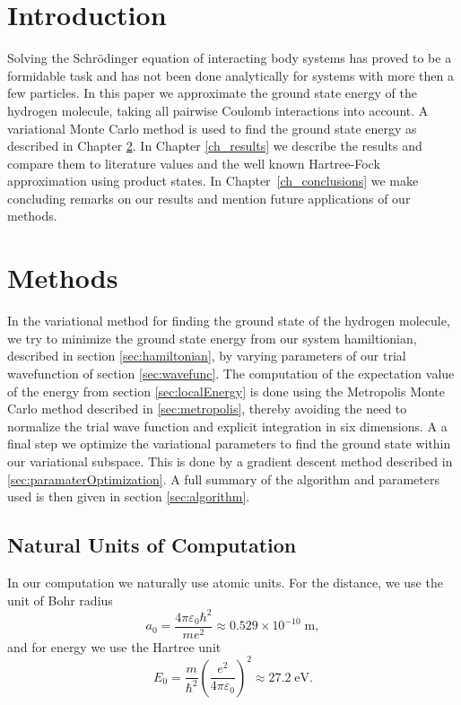\documentclass[twoside]{article}
\newcommand{\unit}[1]{\ensuremath{\; \mathrm{#1}}}
\begin{document}
\section{Introduction}
Solving the Schr\"odinger equation of interacting body systems has proved to be a formidable task and has not been done analytically for systems with more then a few particles. In this paper we approximate the ground state energy of the hydrogen molecule, taking all pairwise Coulomb interactions into account. A variational Monte Carlo method  is used to find the ground state energy as described in Chapter \ref{ch_methods}. In Chapter \ref{ch_results} we describe the results and compare them to literature values and the well known Hartree-Fock approximation using product states. In Chapter~\ref{ch_conclusions} we make concluding remarks on our results and mention future applications of our methods.


\section{Methods}\label{ch_methods}
 In the variational method for finding the ground state of the hydrogen molecule, we try to minimize the ground state energy from our system hamiltionian, described in section \ref{sec:hamiltonian}, by varying parameters of our trial wavefunction of section \ref{sec:wavefunc}. The computation of the expectation value of the energy from section \ref{sec:localEnergy} is done using the Metropolis Monte Carlo method described in \ref{sec:metropolis}, thereby avoiding the need to normalize the trial wave function and explicit integration in six dimensions. A a final step we optimize the variational parameters to find the ground state within our variational subspace. This is done by a gradient descent method described in \ref{sec:paramaterOptimization}. A full summary of the algorithm and parameters used is then given in section \ref{sec:algorithm}.

\subsection{Natural Units of Computation}\label{sec:au}
In our computation we naturally use atomic units. For the distance, we use the unit of Bohr radius
\begin{equation}
a_0 = \frac{4\pi \varepsilon_0 \hbar^2}{me^2} \approx 0.529 \times 10^{-10} \unit{m},
\end{equation}
and for energy we use the Hartree unit
\begin{equation}
E_0 = \frac{m}{\hbar^2} \left(\frac{e^2}{4\pi \varepsilon_0}\right)^2 \approx 27.2 \unit{eV}. 
\end{equation}
\end{document}
